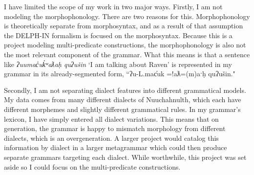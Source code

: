 I have limited the scope of my work in two major ways. Firstly, I am not modeling the morphophonology. There are two reasons for this. Morphophonology is theoretically separate from morphosyntax, and as a result of that assumption the DELPH-IN formalism is focused on the morphosyntax. Because this is a project modeling multi-predicate constructions, the morphophonology is also not the most relevant component of the grammar. What this means is that a sentence like \textit{ʔuumac̓uk̓ʷaƛaḥ quʔušin} `I am talking about Raven' is represented in my grammar in its already-segmented form, ``ʔu-L.mac̓uk =!aƛ=(m)aˑḥ quʔušin."

Secondly, I am not separating dialect features into different grammatical models. My data comes from many different dialects of Nuuchahnulth, which each have different morphemes and slightly different grammatical rules. In my grammar's lexicon, I have simply entered all dialect variations. This means that on generation, the grammar is happy to mismatch morphology from different dialects, which is an overgeneration. A larger project would catalog this information by dialect in a larger metagrammar which could then produce separate grammars targeting each dialect. While worthwhile, this project was set aside so I could focus on the multi-predicate constructions.



